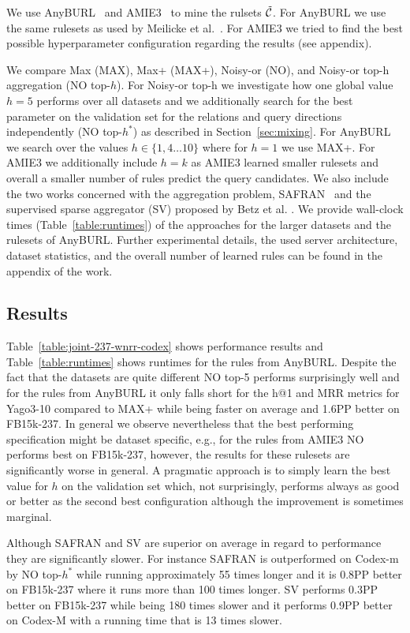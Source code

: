\documentclass{article}
\theoremstyle{plain}
\theoremstyle{remark}
\newcommand{\allatomrules}{\Tilde{\mathcal{C}}}
\begin{document}
We use AnyBURL~\cite{meilicke2019anyburl} and AMIE3~\cite{lajus2020fast} to mine the rulsets $\allatomrules$. For AnyBURL we use the same rulesets as used by Meilicke et al.~. For AMIE3 we tried to find the best possible hyperparameter configuration regarding the results (see appendix).

We compare Max (MAX), Max+ (MAX+), Noisy-or (NO), and Noisy-or top-h aggregation (NO top-$h$). For Noisy-or top-h we investigate how one global value $h=5$ performs over all datasets and we additionally search for the best parameter on the validation set for the relations and query directions independently (NO top-$h^*$) as described in Section~\ref{sec:mixing}. For AnyBURL we search over the values $h \in \{1, 4 \ldots 10\}$ where for $h{=}1$ we use MAX+. For AMIE3 we additionally include $h{=}k$ as AMIE3 learned smaller rulesets and overall a smaller number of rules predict the query candidates. We also include the two works concerned with the aggregation problem, SAFRAN~\cite{ott2021safran} and the supervised sparse aggregator (SV) proposed by Betz et al. . We provide wall-clock times (Table~\ref{table:runtimes}) of the approaches for the larger datasets and the rulesets of AnyBURL. Further experimental details, the used server architecture, dataset statistics, and the overall number of learned rules can be found in the appendix of the work.


\subsection{Results}
Table~\ref{table:joint-237-wnrr-codex} shows performance results and Table~\ref{table:runtimes} shows runtimes for the rules from  AnyBURL. Despite the fact that the datasets are quite different NO top-5 performs surprisingly well and for the rules from AnyBURL it only falls short for the h@1 and MRR metrics for Yago3-10 compared to MAX+ while being faster on average and 1.6PP better on FB15k-237. In general we observe nevertheless that the best performing specification might be dataset specific, e.g., for the rules from AMIE3 NO performs best on FB15k-237, however, the results for these rulesets are significantly worse in general. A pragmatic approach is to simply learn the best value for $h$ on the validation set which, not surprisingly, performs always as good or better as the second best configuration although the improvement is sometimes marginal. 

Although SAFRAN and SV are superior on average in regard to performance they are significantly slower. For instance SAFRAN is outperformed on Codex-m by NO top-$h^*$ while running approximately 55 times longer and it is 0.8PP better on FB15k-237 where it runs more than 100 times longer. SV performs 0.3PP better on FB15k-237 while being 180 times slower and it performs 0.9PP better on Codex-M with a running time that is 13 times slower.
\end{document}
